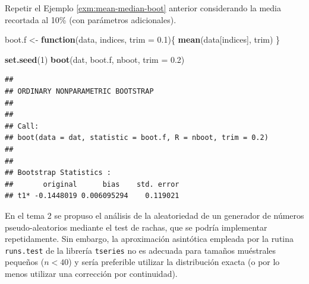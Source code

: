 \documentclass[
]{book}
\newenvironment{Shaded}{\begin{snugshade}}{\end{snugshade}}
\newcommand{\ControlFlowTok}[1]{\textcolor[rgb]{0.13,0.29,0.53}{\textbf{#1}}}
\newcommand{\DataTypeTok}[1]{\textcolor[rgb]{0.13,0.29,0.53}{#1}}
\newcommand{\DecValTok}[1]{\textcolor[rgb]{0.00,0.00,0.81}{#1}}
\newcommand{\FloatTok}[1]{\textcolor[rgb]{0.00,0.00,0.81}{#1}}
\newcommand{\KeywordTok}[1]{\textcolor[rgb]{0.13,0.29,0.53}{\textbf{#1}}}
\newcommand{\NormalTok}[1]{#1}
\newcommand{\StringTok}[1]{\textcolor[rgb]{0.31,0.60,0.02}{#1}}
\theoremstyle{break}
\theoremstyle{definition}
\theoremstyle{definition}
\theoremstyle{definition}
\theoremstyle{remark}
\let\BeginKnitrBlock\begin \let\EndKnitrBlock\end
\begin{document}
\BeginKnitrBlock{exercise}
\protect\hypertarget{exr:mean-trim-boot}{}{\label{exr:mean-trim-boot} }
\EndKnitrBlock{exercise}

Repetir el Ejemplo \ref{exm:mean-median-boot} anterior considerando la media recortada al 10\%
(con parámetros adicionales).

\begin{Shaded}
\begin{Highlighting}[]
\NormalTok{boot.f <-}\StringTok{ }\ControlFlowTok{function}\NormalTok{(data, indices, }\DataTypeTok{trim =} \FloatTok{0.1}\NormalTok{)\{}
  \KeywordTok{mean}\NormalTok{(data[indices], trim)}
\NormalTok{\}}

\KeywordTok{set.seed}\NormalTok{(}\DecValTok{1}\NormalTok{)}
\KeywordTok{boot}\NormalTok{(dat, boot.f, nboot, }\DataTypeTok{trim =} \FloatTok{0.2}\NormalTok{)}
\end{Highlighting}
\end{Shaded}

\begin{verbatim}
## 
## ORDINARY NONPARAMETRIC BOOTSTRAP
## 
## 
## Call:
## boot(data = dat, statistic = boot.f, R = nboot, trim = 0.2)
## 
## 
## Bootstrap Statistics :
##       original      bias    std. error
## t1* -0.1448019 0.006095294    0.119021
\end{verbatim}

\vspace{0.5cm}

\BeginKnitrBlock{exercise}[propuesto]
\protect\hypertarget{exr:rachas-sim}{}{\label{exr:rachas-sim} {} }
\EndKnitrBlock{exercise}

En el tema 2 se propuso el análisis de la aleatoriedad de un
generador de números pseudo-aleatorios mediante el test de rachas,
que se podría implementar repetidamente. Sin embargo, la
aproximación asintótica empleada por la rutina \texttt{runs.test} de la
librería \texttt{tseries} no es adecuada para tamaños muéstrales pequeños
(\(n<40\)) y sería preferible utilizar la distribución exacta (o
por lo menos utilizar una corrección por continuidad).
\end{document}
